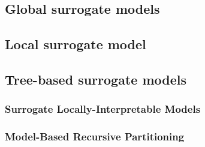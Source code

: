 \subsection{Global surrogate models}

\subsection{Local surrogate model}

\subsection{Tree-based surrogate models}

\subsubsection{Surrogate Locally-Interpretable Models}

\subsubsection{Model-Based Recursive Partitioning}